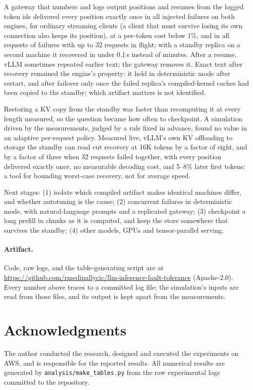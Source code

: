 \documentclass[10pt,twocolumn]{article}
\begin{document}
A gateway that numbers and logs output positions and resumes from the logged
token ids delivered every position exactly once in all \GwKillTrials{}
injected failures on both engines, for ordinary streaming clients (a client
that must survive losing its own connection also keeps its position), at a
per-token cost below 1\%, and in all \PccRecords{} requests
of failures with up to 32 requests in flight; with a standby replica on a
second machine it recovered in under 0.1\,s instead of minutes. After a
resume, vLLM sometimes repeated earlier text; the gateway removes it. Exact text after recovery remained the engine's
property: it held in deterministic mode after restart, and after failover
only once the failed replica's compiled-kernel caches had been copied to the
standby; which artifact matters is not identified.

Restoring a KV copy from the standby was faster than recomputing it at every
length measured, so the question became how often to checkpoint. A
simulation driven by the measurements, judged by a rule fixed in advance,
found no value in an adaptive per-request policy. Measured live, vLLM's own
KV offloading to storage the standby can read cut recovery at 16K tokens by a
factor of eight, and by a factor of three when 32 requests failed together,
with every position delivered exactly once, no measurable decoding cost, and
5--8\% later first tokens: a tool for bounding worst-case recovery, not for
average speed.

Next stages: (1) isolate which compiled artifact makes identical machines
differ, and whether autotuning is the cause; (2) concurrent failures in
deterministic mode, with natural-language prompts and a replicated gateway;
(3) checkpoint a
long prefill in chunks as it is computed, and keep the store somewhere that
survives the standby; (4) other models, GPUs and tensor-parallel serving.

\paragraph{Artifact.} Code, raw logs, and the table-generating script are at
\url{https://github.com/rmedipallycic/llm-inference-fault-tolerance}
(Apache-2.0). Every number above traces to a committed log file; the
simulation's inputs are read from those files, and its output is kept apart
from the measurements.


\section*{Acknowledgments}
The author conducted the research, designed and executed the experiments
on AWS, and is responsible for the reported results. All numerical
results are generated by \texttt{analysis/make\_tables.py} from the
raw experimental logs committed to the repository.


\clearpage


\end{document}
